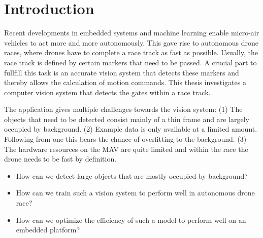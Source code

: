 \chapter{Introduction}
\label{sec:intro}

Recent developments in embedded systems and machine learning enable micro-air vehicles to act more and more autonomously. This gave rise to autonomous drone races, where drones have to complete a race track as fast as possible. Usually, the race track is defined by certain markers that need to be passed. A crucial part to fullfill this task is an accurate vision system that detects these markers and thereby allows the calculation of motion commands. This thesis investigates a computer vision system that detects the gates within a race track.

The application gives multiple challenges towards the vision system: (1) The objects that need to be detected consist mainly of a thin frame and are largely occupied by background. (2) Example data is only available at a limited amount. Following from one this bears the chance of overfitting to the background. (3) The hardware resources on the MAV are quite limited and within the race the drone needs to be fast by definition.

\begin{itemize}
	\item How can we detect large objects that are mostly occupied by background?
	\item How can we train such a vision system to perform well in autonomous drone race?
	\item How can we optimize the efficiency of such a model to perform well on an embedded platform?
\end{itemize}